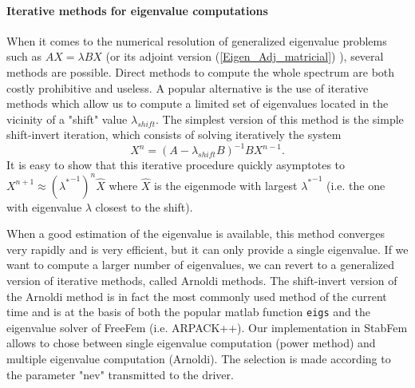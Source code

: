 \documentclass[twocolumn,10pt]{asme2ej}
\begin{document}
\paragraph{Iterative methods for eigenvalue computations}

When it comes to the numerical resolution of generalized eigenvalue problems such as $A X = \lambda B X$ (or its adjoint version (\ref{Eigen_Adj_matricial}) ), several methods are possible. Direct methods to compute the whole spectrum are both costly prohibitive and useless. A popular alternative is the use of iterative methods which allow us to compute a limited set of eigenvalues located in the vicinity of a 
"shift" value $\lambda_{shift}$. The simplest version of this method is the simple shift-invert iteration, which consists of solving iteratively the system
$$
X^{n} =  (A- \lambda_{shift} B)^{-1} B X^{n-1}.
$$ 
It is easy to show that this iterative procedure quickly asymptotes to $X^{n+1} \approx ({\lambda^*}^{-1})^n \hat{X}$
where $\hat{X}$ is the eigenmode with largest ${\lambda^*}^{-1}$ (i.e. the one with eigenvalue $\lambda$ closest to the shift). 


When a good estimation of the eigenvalue is available, this method converges very rapidly and is very efficient, but it can only provide a single eigenvalue.
If we want to compute a larger number of eigenvalues, we can revert to a generalized version of iterative methods, called Arnoldi methods\cite{Arnoldi51}. The shift-invert version of the Arnoldi method is in fact the most commonly used method of the current time and is at the basis of both the popular matlab function {\tt{eigs}} and the eigenvalue solver of FreeFem (i.e. ARPACK++). Our implementation in StabFem allows to chose between single eigenvalue computation (power method) and multiple eigenvalue computation (Arnoldi). The selection is made according to the parameter "nev" transmitted to the driver.
\end{document}
